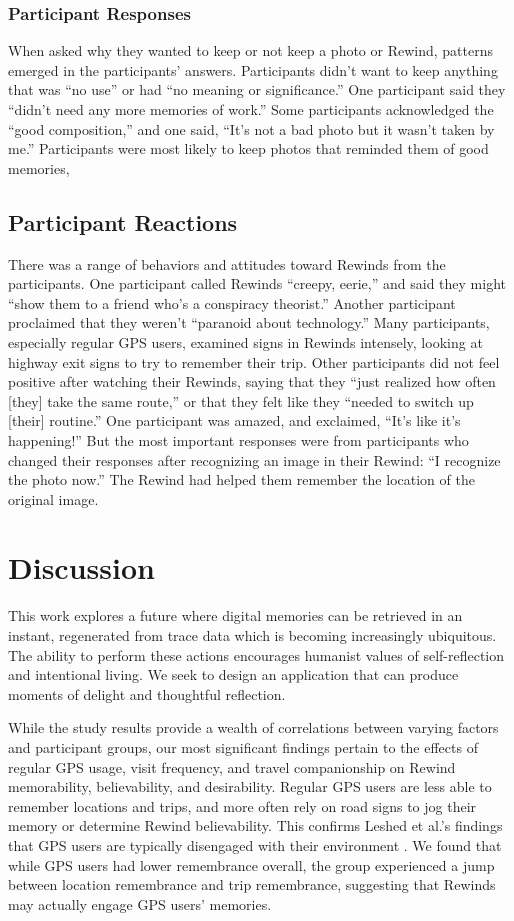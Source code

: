 \documentclass{sigchi}
\begin{document}
\subsubsection{Participant Responses}
When asked why they wanted to keep or not keep a photo or Rewind, patterns emerged in the participants' answers. Participants didn't want to keep anything that was ``no use'' or had ``no meaning or significance.'' One participant said they ``didn't need any more memories of work.'' Some participants acknowledged the ``good composition,'' and one said, ``It's not a bad photo but it wasn't taken by me.'' Participants were most likely to keep photos that reminded them of good memories, 

\subsection{Participant Reactions}
There was a range of behaviors and attitudes toward Rewinds from the participants. One participant called Rewinds ``creepy, eerie,'' and said they might ``show them to a friend who's a conspiracy theorist.'' Another participant proclaimed that they weren't ``paranoid about technology.'' Many participants, especially regular GPS users, examined signs in Rewinds intensely, looking at highway exit signs to try to remember their trip. Other participants did not feel positive after watching their Rewinds, saying that they ``just realized how often [they] take the same route,'' or that they felt like they ``needed to switch up [their] routine.'' One participant was amazed, and exclaimed, ``It's like it's happening!'' But the most important responses were from participants who changed their responses after recognizing an image in their Rewind: ``I recognize the photo now.'' The Rewind had helped them remember the location of the original image.

\section{Discussion}
This work explores a future where digital memories can be retrieved in an instant, regenerated from trace data which is becoming increasingly ubiquitous. The ability to perform these actions encourages humanist values of self-reflection and intentional living. We seek to design an application that can produce moments of delight and thoughtful reflection.

While the study results provide a wealth of correlations between varying factors and participant groups, our most significant findings pertain to the effects of regular GPS usage, visit frequency, and travel companionship on Rewind memorability, believability, and desirability. Regular GPS users are less able to remember locations and trips, and more often rely on road signs to jog their memory or determine Rewind believability. This confirms Leshed et al.'s findings that GPS users are typically disengaged with their environment \cite{leshed2008car}. We found that while GPS users had lower remembrance overall, the group experienced a jump between location remembrance and trip remembrance, suggesting that Rewinds may actually engage GPS users' memories. 
\end{document}

